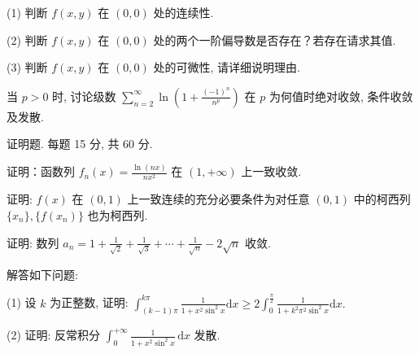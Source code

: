 (1) 判断 $f(x, y)$ 在 $(0, 0)$ 处的连续性.\par
(2) 判断  $f(x,y)$  在  $(0,0)$  处的两个一阶偏导数是否存在？若存在请求其值.\par
(3) 判断 $f(x, y)$ 在 $(0, 0)$ 处的可微性, 请详细说明理由.\par
当 $p > 0$ 时, 讨论级数 $\sum_{n=2}^{\infty} \ln \left(1 + \frac{(-1)^n}{n^p}\right)$ 在 $p$ 为何值时绝对收敛, 条件收敛及发散.\par
\par{}
证明题. 每题 15 分, 共 60 分.\par
证明：函数列 $f_{n}(x) = \frac{\ln(nx)}{nx^{2}}$ 在 $(1, +\infty)$ 上一致收敛.\par
证明: $f(x)$ 在 $(0,1)$ 上一致连续的充分必要条件为对任意 $(0,1)$ 中的柯西列 $\{x_{n}\}, \{f(x_{n})\}$ 也为柯西列.\par
证明: 数列 $a_{n} = 1 + \frac{1}{\sqrt{2}} + \frac{1}{\sqrt{3}} + \cdots + \frac{1}{\sqrt{n}} - 2\sqrt{n}$ 收敛.\par
解答如下问题:\par
(1) 设 $k$ 为正整数, 证明: $\int_{(k-1)\pi}^{k\pi} \frac{1}{1 + x^2 \sin^2 x} \mathrm{d}x \geq 2 \int_0^{\frac{\pi}{2}} \frac{1}{1 + k^2 \pi^2 \sin^2 x} \mathrm{d}x.$\par
(2) 证明: 反常积分 $\int_{0}^{+\infty} \frac{1}{1 + x^2 \sin^2 x} \, \mathrm{d}x$ 发散.\par
